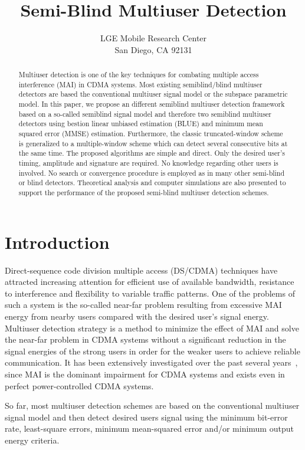 \documentclass[a4paper,11pt,fleqn]{article}
\title{ Semi-Blind Multiuser Detection }
\date{}
\author{LGE Mobile Research Center\\San Diego, CA 92131}
\begin{document}
\maketitle

\begin{abstract}

Multiuser detection is one of the key techniques for combating
multiple access interference (MAI) in CDMA systems. Most existing
semiblind/blind multiuser detectors are based the conventional
multiuser signal model or the subspace parametric model. In this
paper, we propose an different semiblind multiuser detection
framework based on a so-called semiblind signal model and
therefore two semiblind multiuser detectors using bestion linear
unbiased estimation (BLUE) and minimum mean squared error (MMSE)
estimation. Furthermore, the classic truncated-window scheme is
generalized to a multiple-window scheme which can detect several
consecutive bits at the same time. The proposed algorithms are
simple and direct. Only the desired user's timing, amplitude and
signature are required. No knowledge regarding other users is
involved. No search or convergence procedure is employed as in
many other semi-blind or blind detectors. Theoretical analysis and
computer simulations are also presented to support the performance
of the proposed semi-blind multiuser detection schemes.
\end{abstract}

\section{Introduction}

Direct-sequence code division multiple access (DS/CDMA) techniques
have attracted increasing attention for efficient use of available
bandwidth, resistance to interference and flexibility to variable
traffic patterns. One of the problems of such a system is the
so-called near-far problem resulting from excessive MAI energy
from nearby users compared with the desired user's signal energy.
Multiuser detection strategy is a method to minimize the effect of
MAI and solve the near-far problem in CDMA systems without a
significant reduction in the signal energies of the strong users
in order for the weaker users to achieve reliable communication.
It has been extensively investigated over the past several
years~\cite{Verd98}, since MAI is the dominant impairment for CDMA
systems and exists even in perfect power-controlled CDMA systems.

So far, most multiuser detection schemes are based on the
conventional multiuser signal model and then detect desired users
signal using the minimum bit-error rate, least-square errors,
minimum mean-squared error and/or minimum output energy criteria.  
\end{document}
